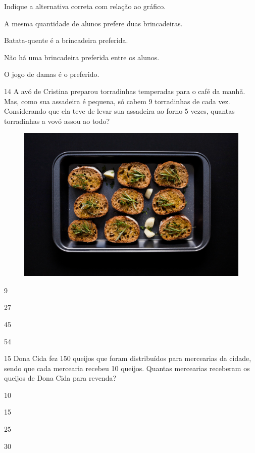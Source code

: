 Indique a alternativa correta com relação ao gráfico.

\begin{escolha}[itemsep=-5pt]
\item A mesma quantidade de alunos prefere duas brincadeiras.

\item Batata-quente é a brincadeira preferida.

\item Não há uma brincadeira preferida entre os alunos.

\item O jogo de damas é o preferido.
\end{escolha}

\num{14} A avó de Cristina preparou torradinhas temperadas para o café da manhã.
Mas, como sua assadeira é pequena, só cabem 9 torradinhas de cada vez.
Considerando que ela teve de levar sua assadeira ao forno 5 vezes,
quantas torradinhas a vovó assou ao todo?

\begin{figure}[H]
\centering
\includegraphics[width=.5\textwidth]{./media/image159.png}
\end{figure}

\begin{escolha}[itemsep=-5pt]
\item 9

\item 27

\item 45

\item 54
\end{escolha}

\num{15} Dona Cida fez 150 queijos que foram distribuídos para mercearias da cidade, sendo que cada mercearia recebeu 10 queijos. Quantas mercearias receberam os queijos de Dona
Cida para revenda?

\begin{escolha}[itemsep=-5pt]
\item 10

\item 15

\item 25

\item 30
\end{escolha}
